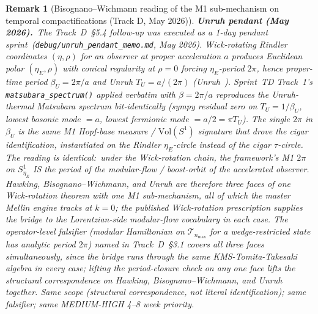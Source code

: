 \documentclass[11pt]{article}
\newtheorem{remark}{Remark}
\begin{document}
\begin{remark}[Bisognano--Wichmann reading of the M1 sub-mechanism on
temporal compactifications (Track D, May 2026)]
\textbf{Unruh pendant (May 2026).}\ The Track~D~\S 5.4 follow-up was
executed as a 1-day pendant
sprint~(\texttt{debug/unruh\_pendant\_memo.md}, May 2026).  Wick-rotating
Rindler coordinates $(\eta, \rho)$ for an observer at proper acceleration
$a$ produces Euclidean polar $(\eta_E, \rho)$ with conical regularity at
$\rho = 0$ forcing $\eta_E$-period $2\pi$, hence proper-time period
$\beta_U = 2\pi / a$ and Unruh $T_U = a/(2\pi)$
(Unruh~\cite{unruh1976}).  Sprint~TD Track~1's
\verb|matsubara_spectrum()| applied verbatim with $\beta = 2\pi/a$
reproduces the Unruh-thermal Matsubara spectrum bit-identically (sympy
residual zero on $T_U = 1/\beta_U$, lowest bosonic mode $= a$, lowest
fermionic mode $= a/2 = \pi T_U$).  The single $2\pi$ in $\beta_U$ is
the same M1 Hopf-base measure / $\mathrm{Vol}(S^1)$ signature that drove
the cigar identification, instantiated on the Rindler $\eta_E$-circle
instead of the cigar $\tau$-circle.  The reading is identical:\
under the Wick-rotation chain, the framework's M1 $2\pi$ on
$S^1_{\eta_E}$ IS the period of the modular-flow / boost-orbit of the
accelerated observer.  Hawking, Bisognano--Wichmann, and Unruh are
therefore three faces of one Wick-rotation theorem with one M1
sub-mechanism, all of which the master Mellin engine tracks at $k = 0$;
the published Wick-rotation prescription supplies the bridge to the
Lorentzian-side modular-flow vocabulary in each case.  The
\emph{operator-level falsifier} (modular Hamiltonian on
$\mathcal{T}_{n_{\max}}$ for a wedge-restricted state has analytic
period $2\pi$) named in Track~D~\S 3.1 covers all three faces
simultaneously, since the bridge runs through the same KMS-Tomita-Takesaki
algebra in every case; lifting the period-closure check on any one face
lifts the structural correspondence on Hawking, Bisognano--Wichmann, and
Unruh together.  Same scope (structural correspondence, not literal
identification); same falsifier; same MEDIUM-HIGH 4--8 week priority.


\end{remark}
\end{document}
